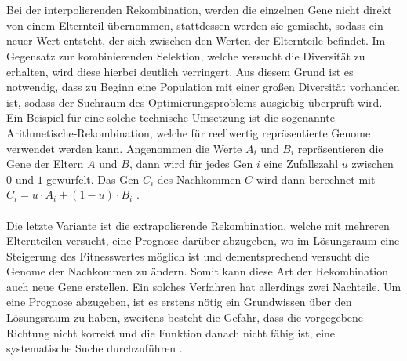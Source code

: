 \\\\
Bei der interpolierenden Rekombination, werden die einzelnen Gene nicht direkt von einem Elternteil übernommen, stattdessen werden sie gemischt, sodass ein neuer Wert entsteht, der sich zwischen den Werten der Elternteile befindet. Im Gegensatz zur kombinierenden Selektion, welche versucht die Diversität zu erhalten, wird diese hierbei deutlich verringert. Aus diesem Grund ist es notwendig, dass zu Beginn eine Population mit einer großen Diversität vorhanden ist, sodass der Suchraum  des Optimierungsproblems ausgiebig überprüft wird. Ein Beispiel für eine solche technische Umsetzung ist die sogenannte Arithmetische-Rekombination, welche für reellwertig repräsentierte Genome verwendet werden kann. Angenommen die Werte $A_i$ und $B_i$ repräsentieren die Gene der Eltern $A$ und $B$, dann wird für jedes Gen $i$ eine Zufallszahl $u$ zwischen $0$ und $1$ gewürfelt. Das Gen $C_i$ des Nachkommen $C$ wird dann berechnet mit $C_i=u \cdot A_i + (1-u) \cdot B_i$ \cite{weicker2015evolutionare}.
\\\\
Die letzte Variante ist die extrapolierende Rekombination, welche mit mehreren Elternteilen versucht, eine Prognose darüber abzugeben, wo im Lösungsraum eine Steigerung des Fitnesswertes möglich ist und dementsprechend versucht die Genome der Nachkommen zu ändern. Somit kann diese Art der Rekombination auch neue Gene erstellen. Ein solches Verfahren hat allerdings zwei Nachteile. Um eine Prognose abzugeben, ist es erstens nötig ein Grundwissen über den Lösungsraum zu haben, zweitens besteht die Gefahr, dass die vorgegebene Richtung nicht korrekt und die Funktion danach nicht fähig ist, eine systematische Suche durchzuführen \cite{weicker2015evolutionare}.   


